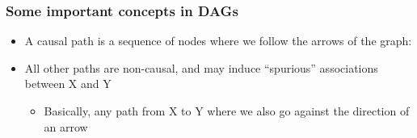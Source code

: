 \documentclass[10pt]{article}
\begin{document}
\subsubsection{Some important concepts in DAGs}
\begin{itemize}
    \item A causal path is a sequence of nodes where we follow the arrows of the graph: 
    \item All other paths are non-causal, and may induce ``spurious'' associations between X and Y
    \begin{itemize}
        \item Basically, any path from X to Y where we also go against the direction of an arrow
    \end{itemize}
\end{itemize}
\end{document}
